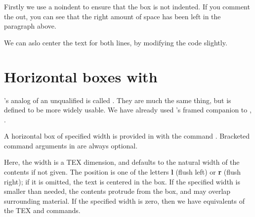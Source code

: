 {%
{}%

Firstly we use a noindent to ensure that the box is not indented. If you comment the  out, you can see that the right amount of space has been left in the paragraph above.

\mbox{}
 
\noindent
{}%


\begin{marginfigure}
\noindent
{}%
\end{marginfigure}
We can aslo center the text for both lines, by modifying the code slightly.
\begin{teX}
\noindent
{}%
\end{teX}

\begin{marginfigure}
\noindent
{}%
\end{marginfigure}


\section{Horizontal boxes with \protect\LaTeXe}

\latex's analog of an unqualified  is called . They are 
much the
same thing, but  is defined to be more widely usable. We have already
used \latex's framed companion to , .

A horizontal box of specified width is provided in \latex with the command
. Bracketed command arguments
in \latex are always optional. 

Here, the width is a TEX dimension,
and defaults to the natural width of the contents if not given. The position
is one of the letters \textbf{l} (flush left) or \textbf{r} (flush right); if it is omitted, the text
is centered in the box. If the specified width is smaller than needed, the
contents protrude from the box, and may overlap surrounding material. If
the specified width is zero, then we have equivalents of the TEX  and
 commands.


}
